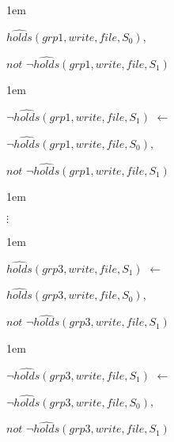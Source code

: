 \documentclass[global,twocolumn,final]{svjour}
\newenvironment{vexample}
  {\begin{example}\hspace{0.25em}}
  {\end{example}}
\newenvironment{vquote}
  {\begin{list}{}{\leftmargin 1em}\item[]}
  {\end{list}}
\begin{document}
\begin{vexample}
\begin{enumerate}
\begin{vquote}
                \hspace{1em}
                $\hat{holds}(grp1, write, file, S_{0})$,

                \hspace{1em}
                $not$ $\lnot\hat{holds}(grp1, write, file, S_{1})$
              \end{vquote}

              \begin{vquote}
                $\lnot\hat{holds}(grp1, write, file, S_{1})$ $\leftarrow$

                \hspace{1em}
                $\lnot\hat{holds}(grp1, write, file, S_{0})$,

                \hspace{1em}
                $not$ $\lnot\hat{holds}(grp1, write, file, S_{1})$
              \end{vquote}

              \begin{vquote}
                \hspace{2em}$\vdots$
              \end{vquote}

              \begin{vquote}
                $\hat{holds}(grp3, write, file, S_{1})$ $\leftarrow$

                \hspace{1em}
                $\hat{holds}(grp3, write, file, S_{0})$,

                \hspace{1em}
                $not$ $\lnot\hat{holds}(grp3, write, file, S_{1})$
              \end{vquote}

              \begin{vquote}
                $\lnot\hat{holds}(grp3, write, file, S_{1})$ $\leftarrow$

                \hspace{1em}
                $\lnot\hat{holds}(grp3, write, file, S_{0})$,

                \hspace{1em}
                $not$ $\lnot\hat{holds}(grp3, write, file, S_{1})$
              \end{vquote}


\end{enumerate}
\end{vexample}
\end{document}

